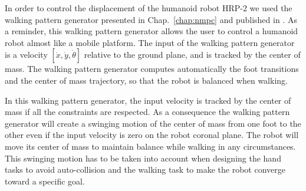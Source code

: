 In order to control the displacement of the humanoid robot HRP-$2$ we used the walking pattern generator presented in Chap.~\ref{chap:nmpc} and published in \cite{naveau:ral:2016}.
As a reminder, this walking pattern generator allows the user to control a humanoid robot almost like a mobile platform.
The input of the walking pattern generator is a velocity $ [\dot{x},\dot{y},\dot{\theta}] $ relative to the ground plane, and is tracked by the center of mass.
The walking pattern generator computes automatically the foot transitions and the center of mass trajectory, so that the robot is balanced when walking.

In this walking pattern generator, the input velocity is tracked by the center of mass if all the constraints are respected.
As a consequence the walking pattern generator will create a swinging motion of the center of mass from one foot to the other even if the input velocity is zero on the robot coronal plane.
The robot will move its center of mass to maintain balance while walking in any circumstances.
This swinging motion has to be taken into account when designing the hand tasks to avoid auto-collision and the walking task to make the robot converge toward a specific goal.

